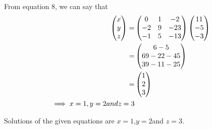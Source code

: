 \documentclass[two column]{article}
\begin{document}
\begin{enumerate}
\begin{align}
                    \end{align}
                    From equation 8, we can say that
                    \begin{align}
                    \begin{pmatrix}x\\y\\z\end{pmatrix}=&\begin{pmatrix}0 & 1 & -2\\ -2& 9 & -23 \\ -1 & 5 & -13\end{pmatrix}\begin{pmatrix}11\\-5\\-3\end{pmatrix}\\
                    =&\begin{pmatrix}6-5\\69-22-45\\39-11-25\end{pmatrix}\\
                    =&\begin{pmatrix}1\\2\\3\end{pmatrix}\\
                    \implies  x=1, y=2 and z=3 \\
                    \end{align}
                     \end{enumerate}
                     
                     
                    Solutions of the given equations are $x=1$,$y=2 $and $ z=3$. 
                    
                    
                    
\end{document}
